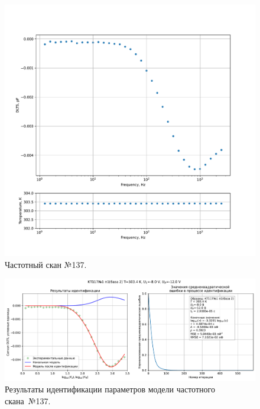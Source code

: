 \begin{figure}[!ht]
    \centering
    \includegraphics[width=1\textwidth]{../plots/КТ117№1_п1(база 2)_2500Гц-1Гц_1пФ_+30С_-8В-12В_100мВ_20мкс_шаг_0,1.pdf}
    \caption{Частотный скан №137.}
    \label{pic:frequency_scan_137}
\end{figure}

\begin{figure}[!ht]
    \centering
    \includegraphics[width=1\textwidth]{../plots/КТ117№1_п1(база 2)_2500Гц-1Гц_1пФ_+30С_-8В-12В_100мВ_20мкс_шаг_0,1_model.pdf}
    \caption{Результаты идентификации параметров модели частотного скана~№137.}
    \label{pic:frequency_scan_model137}
\end{figure}

\pagebreak


